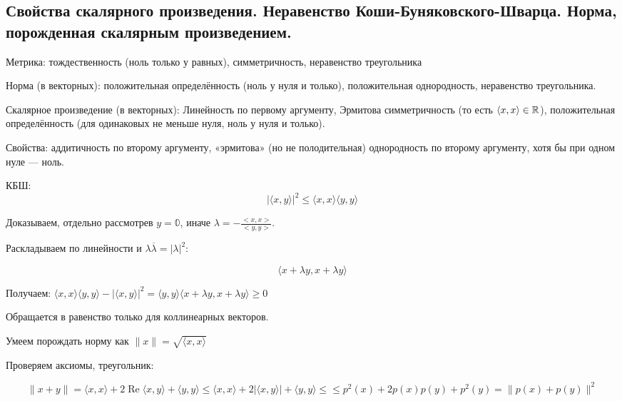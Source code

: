 \documentclass[12pt, a4paper]{article}
\begin{document}
\subsection{Свойства скалярного произведения. Неравенство Коши-Буняковского-Шварца. Норма, порожденная скалярным произведением.}

Метрика: тождественность (ноль только у равных), симметричность, неравенство треугольника

Норма (в векторных): положительная определённость (ноль у нуля и только), положительная однородность, неравенство треугольника.

Скалярное произведение (в векторных): Линейность по первому аргументу, Эрмитова симметричность (то есть $\left<x, x \right> \in {\mathbb{R}}$), положительная определённость (для одинаковых не меньше нуля, ноль у нуля и только).

Свойства: аддитичность по второму аргументу, «эрмитова» (но не полодительная) однородность по второму аргументу, хотя бы при одном нуле — ноль.

КБШ: 
\begin{equation}
    \left| \langle x, y \rangle \right|^2 \leqslant \langle x, x \rangle \langle y, y \rangle
\end{equation}

Доказываем, отдельно рассмотрев $y = \mathbb{0}$, иначе $\lambda = -\frac{<x, x>}{<y, y>}$.

Раскладываем по линейности и $\lambda \overline{\lambda} = |\lambda|^2$:

\begin{equation*}
    \langle x+\lambda y, x+\lambda y\rangle
\end{equation*}

Получаем: $\langle x, x\rangle\langle y, y\rangle-|\langle x, y\rangle|^{2}=\langle y, y\rangle\langle x+\lambda y, x+\lambda y\rangle \geqslant 0$

Обращается в равенство только для коллинеарных векторов.

Умеем порождать норму как $\| x \| = \sqrt{\langle x, x \rangle}$

Проверяем аксиомы, треугольник:

\begin{equation*}
    \| x+y \| 
    = \langle x, x\rangle+2 \operatorname{Re} \langle x, y\rangle+\langle y, y\rangle 
    \leqslant \langle x, x\rangle+2|\langle x, y\rangle|+\langle y, y\rangle \leqslant
    \leqslant p^{2}(x)+2 p(x) p(y)+p^{2}(y)= \|p(x)+p(y)\|^2
\end{equation*}
\end{document}

